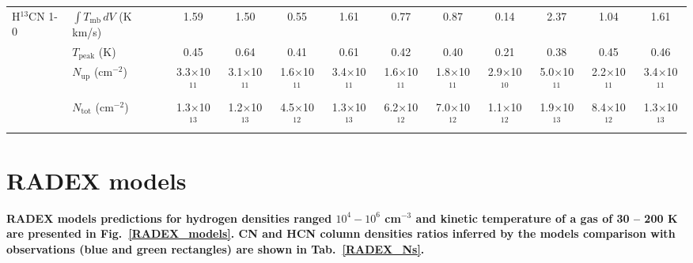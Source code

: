 \documentclass{aa}
\begin{document}
\begin{appendix}
\begin{sidewaystable*}
\begin{tabular}{l l c c c c c c c c c c}
\multirow{4}{*}{H$^{13}$CN 1-0} & $\int{T_{\mathrm{mb}} \, dV}$ (K km/s) & 1.59 & 1.50 & 0.55 & 1.61 & 0.77 & 0.87 & 0.14 & 2.37 & 1.04 & 1.61 \\
& $T_\mathrm{peak}$ (K) & 0.45 & 0.64 & 0.41 & 0.61 & 0.42 & 0.40 & 0.21 & 0.38 & 0.45 & 0.46 \\
& $N_\mathrm{up}$ (cm$^{-2}$) & 3.3$\times$10$^{11}$ & 3.1$\times$10$^{11}$ & 1.6$\times$10$^{11}$ & 3.4$\times$10$^{11}$ & 1.6$\times$10$^{11}$ & 1.8$\times$10$^{11}$ & 2.9$\times$10$^{10}$ & 5.0$\times$10$^{11}$ & 2.2$\times$10$^{11}$ & 3.4$\times$10$^{11}$ \\
& $N_\mathrm{tot}$ (cm$^{-2}$) & 1.3$\times$10$^{13}$ & 1.2$\times$10$^{13}$ & 4.5$\times$10$^{12}$ & 1.3$\times$10$^{13}$ & 6.2$\times$10$^{12}$ & 7.0$\times$10$^{12}$ & 1.1$\times$10$^{12}$ & 1.9$\times$10$^{13}$ & 8.4$\times$10$^{12}$ & 1.3$\times$10$^{13}$\\

\hline\hline
\end{tabular}
\end{sidewaystable*}

\section{RADEX models}

\textbf{RADEX models predictions for hydrogen densities ranged $10^{4}-10^{6}$ cm$^{-3}$ and kinetic temperature of a gas of 30 – 200 K are presented in Fig.~\ref{RADEX_models}. CN and HCN column densities ratios inferred by the models comparison with observations (blue and green rectangles) are shown in Tab.~\ref{RADEX_Ns}.}


\end{appendix}
\end{document}
